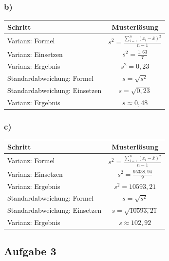 \documentclass[
  11pt,
  ngerman,
  a4paper,
]{report}
\begin{document}
\hypertarget{b-3}{%
\subsubsection{b)}\label{b-3}}

\begin{table}[H]
\centering
\begin{tabular}{lc}
\toprule
Schritt & Musterlösung\\
\midrule
Varianz: Formel & $s^2=\frac{\sum\limits_{i=1}^{n}(x_{i}-\bar{x})^2}{n-1}$\\
Varianz: Einsetzen & $s^2=\frac{1{,}63}{7}$\\
Varianz: Ergebnis & $s^2=0{,}23$\\
Standardabweichung: Formel & $s=\sqrt{s^2}$\\
Standardabweichung: Einsetzen & $s=\sqrt{0{,}23}$\\
Varianz: Ergebnis & $s\approx0{,}48$\\
\bottomrule
\end{tabular}
\end{table}

\hypertarget{c-3}{%
\subsubsection{c)}\label{c-3}}

\begin{table}[H]
\centering
\begin{tabular}{lc}
\toprule
Schritt & Musterlösung\\
\midrule
Varianz: Formel & $s^2=\frac{\sum\limits_{i=1}^{n}(x_{i}-\bar{x})^2}{n-1}$\\
Varianz: Einsetzen & $s^2=\frac{95338{,}94}{9}$\\
Varianz: Ergebnis & $s^2=10593{,}21$\\
Standardabweichung: Formel & $s=\sqrt{s^2}$\\
Standardabweichung: Einsetzen & $s=\sqrt{10593{,}21}$\\
Varianz: Ergebnis & $s\approx102{,}92$\\
\bottomrule
\end{tabular}
\end{table}

\hypertarget{aufgabe-3-3}{%
\subsection{Aufgabe 3}\label{aufgabe-3-3}}
\end{document}
